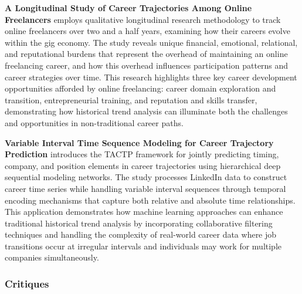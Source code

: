 \documentclass[../main.tex]{subfiles}
\begin{document}
\textbf{A Longitudinal Study of Career Trajectories Among Online Freelancers} \citep{carnegie2018} employs qualitative longitudinal research methodology to track online freelancers over two and a half years, examining how their careers evolve within the gig economy. The study reveals unique financial, emotional, relational, and reputational burdens that represent the overhead of maintaining an online freelancing career, and how this overhead influences participation patterns and career strategies over time. This research highlights three key career development opportunities afforded by online freelancing: career domain exploration and transition, entrepreneurial training, and reputation and skills transfer, demonstrating how historical trend analysis can illuminate both the challenges and opportunities in non-traditional career paths.


\textbf{Variable Interval Time Sequence Modeling for Career Trajectory Prediction} \citep{wang2021} introduces the TACTP framework for jointly predicting timing, company, and position elements in career trajectories using hierarchical deep sequential modeling networks. The study processes LinkedIn data to construct career time series while handling variable interval sequences through temporal encoding mechanisms that capture both relative and absolute time relationships. This application demonstrates how machine learning approaches can enhance traditional historical trend analysis by incorporating collaborative filtering techniques and handling the complexity of real-world career data where job transitions occur at irregular intervals and individuals may work for multiple companies simultaneously.

\subsubsection{Critiques}
\end{document}
